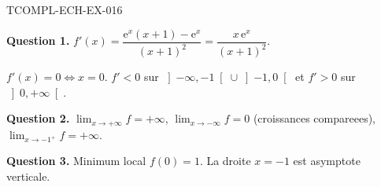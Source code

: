\begin{corrige}{TCOMPL-ECH-EX-016}

\textbf{Question 1.} $f'(x) = \dfrac{\mathrm{e}^x(x+1) - \mathrm{e}^x}{(x+1)^2} = \dfrac{x\,\mathrm{e}^x}{(x+1)^2}$.


$f'(x) = 0 \iff x = 0$. $f' < 0$ sur $\left]-\infty, -1\right[ \cup \left]-1, 0\right[$ et $f' > 0$ sur $\left]0, +\infty\right[$.

\textbf{Question 2.} $\lim_{x \to +\infty} f = +\infty$, $\lim_{x \to -\infty} f = 0$ (croissances compareees), $\lim_{x \to -1^+} f = +\infty$.

\textbf{Question 3.} Minimum local $f(0) = 1$. La droite $x = -1$ est asymptote verticale.

\end{corrige}
